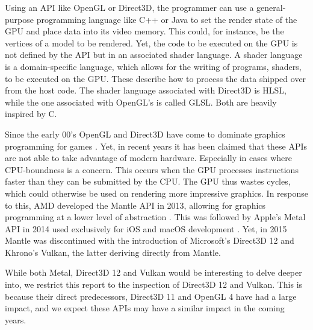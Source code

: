 Using an \gls{API} like OpenGL or Direct3D, the programmer can use a general-purpose programming language like C++ or Java to set the render state of the \gls{GPU} and place data into its video memory.
This could, for instance, be the vertices of a model to be rendered. 
Yet, the code to be executed on the \gls{GPU} is not defined by the \gls{API} but in an associated shader language.  
A shader language is a domain-specific language, which allows for the writing of programs, shaders, to be executed on the \gls{GPU}.
These describe how to process the data shipped over from the host code. 
The shader language associated with Direct3D is \gls{HLSL}, while the one associated with OpenGL's is called \gls{GLSL}.
Both are heavily inspired by C.


Since the early 00's OpenGL and Direct3D have come to dominate graphics programming for games \cite{wikiGpu}.
Yet, in recent years it has been claimed that these \glspl{API} are not able to take advantage of modern hardware.
Especially in cases where \gls{CPU}-boundness is a concern.
This occurs when the \gls{GPU} processes instructions faster than they can be submitted by the \gls{CPU}.
The \gls{GPU} thus wastes cycles, which could otherwise be used on rendering more impressive graphics. 
In response to this, AMD developed the Mantle \gls{API} in 2013, allowing for graphics programming at a lower level of abstraction \cite{wikiMantle}. 
This was followed by Apple’s Metal \gls{API} in 2014 used exclusively for iOS and macOS development \cite{wikiMetal}. 
Yet, in 2015 Mantle was discontinued with the introduction of Microsoft’s Direct3D 12\cite{wikipedia????directx} and Khrono’s Vulkan\cite{wikiVulkan}, the latter deriving directly from Mantle. 


While both Metal, Direct3D 12 and Vulkan would be interesting to delve deeper into, we restrict this report to the inspection of Direct3D 12 and Vulkan.
This is because their direct predecessors, Direct3D 11 and OpenGL 4 have had a large impact, and we expect these \glspl{API} may have a similar impact in the coming years.




